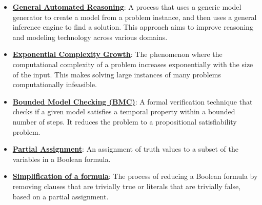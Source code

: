 \documentclass{article}%
\begin{document}
\begin{itemize}[leftmargin=*]%
\item \href{https://purdue.brightspace.com/d2l/common/assets/pdfjs-d2l-dist/1.0.14-legacy/web/viewer.html?file=\%2Fcontent\%2Fenforced\%2F1095467-wl.202510.CS.24300.001\%2F15L2-SAT.pdf\%3Fou\%3D1095467\&lang=en-us\&container=d2l-fileviewer-rendered-pdf\&fullscreen=d2l-fileviewer-rendered-pdf-dialog\&height=667#page=3}{\textbf{General Automated Reasoning}}: A process that uses a generic model generator to create a model from a problem instance, and then uses a general inference engine to find a solution. This approach aims to improve reasoning and modeling technology across various domains.%
\item \href{https://purdue.brightspace.com/d2l/common/assets/pdfjs-d2l-dist/1.0.14-legacy/web/viewer.html?file=\%2Fcontent\%2Fenforced\%2F1095467-wl.202510.CS.24300.001\%2F15L2-SAT.pdf\%3Fou\%3D1095467\&lang=en-us\&container=d2l-fileviewer-rendered-pdf\&fullscreen=d2l-fileviewer-rendered-pdf-dialog\&height=667#page=4}{\textbf{Exponential Complexity Growth}}: The phenomenon where the computational complexity of a problem increases exponentially with the size of the input. This makes solving large instances of many problems computationally infeasible.%
\item \href{https://purdue.brightspace.com/d2l/common/assets/pdfjs-d2l-dist/1.0.14-legacy/web/viewer.html?file=\%2Fcontent\%2Fenforced\%2F1095467-wl.202510.CS.24300.001\%2F15L2-SAT.pdf\%3Fou\%3D1095467\&lang=en-us\&container=d2l-fileviewer-rendered-pdf\&fullscreen=d2l-fileviewer-rendered-pdf-dialog\&height=667#page=6}{\textbf{Bounded Model Checking (BMC)}}: A formal verification technique that checks if a given model satisfies a temporal property within a bounded number of steps. It reduces the problem to a propositional satisfiability problem.%
\item \href{https://purdue.brightspace.com/d2l/common/assets/pdfjs-d2l-dist/1.0.14-legacy/web/viewer.html?file=\%2Fcontent\%2Fenforced\%2F1095467-wl.202510.CS.24300.001\%2F15L2-SAT.pdf\%3Fou\%3D1095467\&lang=en-us\&container=d2l-fileviewer-rendered-pdf\&fullscreen=d2l-fileviewer-rendered-pdf-dialog\&height=667#page=14}{\textbf{Partial Assignment}}: An assignment of truth values to a subset of the variables in a Boolean formula.%
\item \href{https://purdue.brightspace.com/d2l/common/assets/pdfjs-d2l-dist/1.0.14-legacy/web/viewer.html?file=\%2Fcontent\%2Fenforced\%2F1095467-wl.202510.CS.24300.001\%2F15L2-SAT.pdf\%3Fou\%3D1095467\&lang=en-us\&container=d2l-fileviewer-rendered-pdf\&fullscreen=d2l-fileviewer-rendered-pdf-dialog\&height=667#page=15}{\textbf{Simplification of a formula}}: The process of reducing a Boolean formula by removing clauses that are trivially true or literals that are trivially false, based on a partial assignment.%

\end{itemize}
\end{document}
